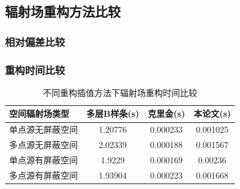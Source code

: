 \documentclass{beamer}
\begin{document}
\subsection{辐射场重构方法比较}
\begin{frame}
    \frametitle{相对偏差比较}
    \begin{figure}[htbp]
        \centering
    \end{figure}
\end{frame}

\begin{frame}
    \frametitle{重构时间比较}
    \begin{table}[htbp]
        \centering
        \caption{\label{tab:test4}不同重构插值方法下辐射场重构时间比较}
        \begin{tabular}{lccc}
            \toprule
            空间辐射场类型   & 多层B样条(s) & 克里金(s) & 本论文(s) \\
            \midrule
            单点源无屏蔽空间 & 1.20776      & 0.000233  & 0.001025  \\
            多点源无屏蔽空间 & 2.02339      & 0.000188  & 0.001567  \\
            单点源有屏蔽空间 & 1.9229       & 0.000169  & 0.00236   \\
            多点源有屏蔽空间 & 1.93904      & 0.000223  & 0.001668  \\
            \bottomrule
        \end{tabular}
        \label{不同重构插值方法下辐射场重构时间比较}
    \end{table}
\end{frame}
\end{document}
